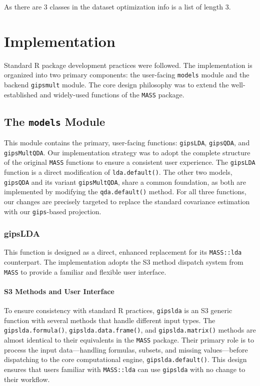 \documentclass[a4paper,11pt,twoside]{report}
\theoremstyle{definition}
\begin{document}
As there are 3 classes in the dataset optimization info is a list of length 3.


\section{Implementation}
Standard R package development practices were followed.
The implementation is organized into two primary
components: the user-facing \texttt{models} module and the backend \texttt{gipsmult} module.
The core design philosophy was to extend the well-established and widely-used
functions of the \texttt{MASS} package.

\subsection{The \texttt{models} Module}
This module contains the primary, user-facing functions: \texttt{gipsLDA}, \texttt{gipsQDA}, and \texttt{gipsMultQDA}. Our implementation strategy was to adopt the complete structure of the original \texttt{MASS} functions to ensure a consistent user experience. The \texttt{gipsLDA} function is a direct modification of \texttt{lda.default()}. The other two models, \texttt{gipsQDA} and its variant \texttt{gipsMultQDA}, share a common foundation, as both are implemented by modifying the \texttt{qda.default()} method. For all three functions, our changes are precisely targeted to replace the standard covariance estimation with our \texttt{gips}-based projection.

\subsubsection{gipsLDA}
This function is designed as a direct, enhanced replacement for its \texttt{MASS::lda} counterpart. The implementation adopts the S3 method dispatch system from \texttt{MASS} to provide a familiar and flexible user interface.

\paragraph{S3 Methods and User Interface}
To ensure consistency with standard R practices, \texttt{gipslda} is an S3 generic function with several methods that handle different input types. The \texttt{gipslda.formula()}, \texttt{gipslda.data.frame()}, and \texttt{gipslda.matrix()} methods are almost identical to their equivalents in the \texttt{MASS} package. Their primary role is to process the input data—handling formulas, subsets, and missing values—before dispatching to the core computational engine, \texttt{gipslda.default()}. This design ensures that users familiar with \texttt{MASS::lda} can use \texttt{gipslda} with no change to their workflow.
\end{document}
